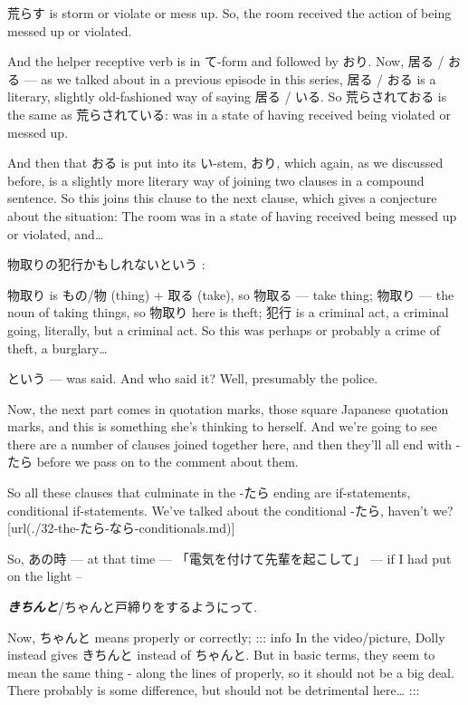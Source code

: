 荒らす is storm or violate or mess up. So, the room received the action of being messed up or violated.

And the helper receptive verb is in て-form and followed by おり. Now, 居る / おる --- as we talked about in a previous episode in this series, 居る / おる is a literary, slightly old-fashioned way of saying 居る / いる. So 荒らされておる is the same as 荒らされている: was in a state of having received being violated or messed up.

And then that おる is put into its い-stem, おり, which again, as we discussed before, is a slightly more literary way of joining two clauses in a compound sentence. So this joins this clause to the next clause, which gives a conjecture about the situation: The room was in a state of having received being messed up or violated, and\ldots{}

物取りの犯行かもしれないという :

物取り is もの/物 (thing) + 取る (take), so 物取る --- take thing; 物取り --- the noun of taking things, so 物取り here is theft; 犯行 is a criminal act, a criminal going, literally, but a criminal act.\crlf
So this was perhaps or probably a crime of theft, a burglary\ldots{}

という --- was said. And who said it? Well, presumably the police.

\thinrule

Now, the next part comes in quotation marks, those square Japanese quotation marks, and this is something she's thinking to herself. And we're going to see there are a number of clauses joined together here, and then they'll all end with -たら before we pass on to the comment about them.

{}

So all these clauses that culminate in the -たら ending are if-statements, conditional if-statements. We've talked about the conditional -たら, haven't we? \goto{{[}32{]}}[url(./32-the-たら-なら-conditionals.md)]

So, あの時 --- at that time --- 「電気を付けて先輩を起こして」 --- if I had put on the light --

{}

{\bf {\em きちんと}}/ちゃんと戸締りをするようにって.

Now, ちゃんと means properly or correctly; ::: info In the video/picture, Dolly instead gives きちんと instead of ちゃんと.\crlf
But in basic terms, they seem to mean the same thing - along the lines of properly, so it should not be a big deal. There probably is some difference, but should not be detrimental here\ldots{} :::

